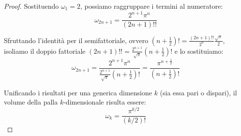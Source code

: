 \begin{proof}
Sostituendo $\omega_1 = 2$, possiamo raggruppare i termini al numeratore:
$$\omega_{2n+1} = \frac{2^{n+1} \pi^n}{(2n+1)!!}$$

Sfruttando l'identità per il semifattoriale, ovvero $(n+\frac{1}{2})! = \frac{(2n+1)!!}{2^n} \frac{\sqrt{\pi}}{2}$, isoliamo il doppio fattoriale $(2n+1)!! = \frac{2^{n+1}}{\sqrt{\pi}} (n+\frac{1}{2})!$ e lo sostituiamo:
$$\omega_{2n+1} = \frac{2^{n+1} \pi^n}{\frac{2^{n+1}}{\sqrt{\pi}} (n+\frac{1}{2})!} = \frac{\pi^{n+\frac{1}{2}}}{(n+\frac{1}{2})!}$$

Unificando i risultati per una generica dimensione $k$ (sia essa pari o dispari), il volume della palla $k$-dimensionale risulta essere:
$$\omega_k = \frac{\pi^{k/2}}{(k/2)!}$$

\end{proof}